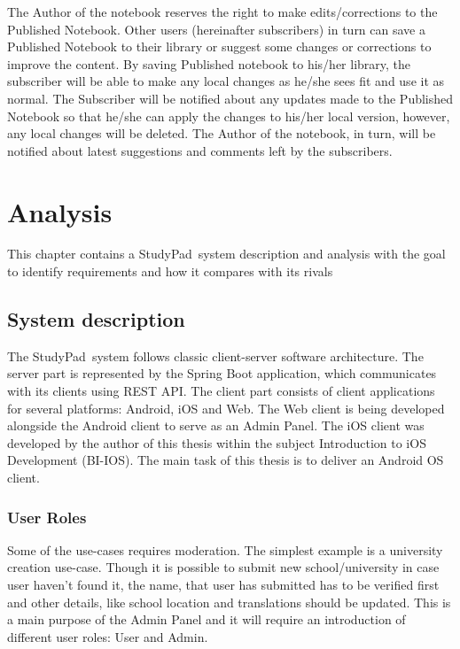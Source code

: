 \documentclass[thesis=B,english]{FITthesis}[2012/10/20]
\newcommand{\appname}{StudyPad}
\begin{document}
The Author of the notebook reserves the right to make edits/corrections to the Published Notebook. Other users (hereinafter subscribers) in turn can save a Published Notebook to their library or suggest some changes or corrections to improve the content. By saving Published notebook to his/her library, the subscriber will be able to make any local changes as he/she sees fit and use it as normal. The Subscriber will be notified about any updates made to the Published Notebook so that he/she can apply the changes to his/her local version, however, any local changes will be deleted. The Author of the notebook, in turn, will be notified about latest suggestions and comments left by the subscribers.

\chapter{Analysis}
This chapter contains a \appname\ system description and analysis with the goal to identify requirements and how it compares with its rivals


\section{System description}

The \appname\ system follows classic client-server software architecture. The server part is represented by the Spring Boot application, which communicates with its clients using REST API. The client part consists of client applications for several platforms: Android, iOS and Web. The Web client is being developed alongside the Android client to serve as an Admin Panel.\cite{studypad-web} The iOS client was developed by the author of this thesis  within the subject Introduction to iOS Development (BI-IOS). \cite{studypad-ios} The main task of this thesis is to deliver an Android OS client.

\subsection{User Roles}
Some of the use-cases requires moderation. The simplest example is a university creation use-case. Though it is possible to submit new school/university in case user haven't found it, the name, that user has submitted has to be verified first and other details, like school location and translations should be updated. This is a main purpose of the Admin Panel and it will require an introduction of different user roles: User and Admin. 
\end{document}
